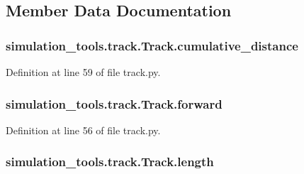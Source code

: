 \subsection{Member Data Documentation}
\subsubsection[{\texorpdfstring{cumulative\+\_\+distance}{cumulative_distance}}]{\setlength{\rightskip}{0pt plus 5cm}simulation\+\_\+tools.\+track.\+Track.\+cumulative\+\_\+distance}\hypertarget{classsimulation__tools_1_1track_1_1_track_a4513ffc3cdb1963bce98c678b093c40b}{}\label{classsimulation__tools_1_1track_1_1_track_a4513ffc3cdb1963bce98c678b093c40b}


Definition at line 59 of file track.\+py.

\subsubsection[{\texorpdfstring{forward}{forward}}]{\setlength{\rightskip}{0pt plus 5cm}simulation\+\_\+tools.\+track.\+Track.\+forward}\hypertarget{classsimulation__tools_1_1track_1_1_track_ae944fe956579cafe73bf09d3a7c072bc}{}\label{classsimulation__tools_1_1track_1_1_track_ae944fe956579cafe73bf09d3a7c072bc}


Definition at line 56 of file track.\+py.

\subsubsection[{\texorpdfstring{length}{length}}]{\setlength{\rightskip}{0pt plus 5cm}simulation\+\_\+tools.\+track.\+Track.\+length}\hypertarget{classsimulation__tools_1_1track_1_1_track_a24b60622edd3b0825f31fd6426d9380b}{}\label{classsimulation__tools_1_1track_1_1_track_a24b60622edd3b0825f31fd6426d9380b}


